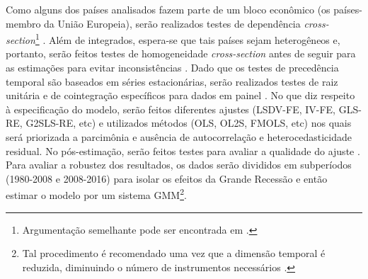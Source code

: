 Como alguns dos países analisados fazem parte de um bloco econômico (os países-membro da União Europeia), serão realizados testes de dependência \textit{cross-section}\footnote{Argumentação semelhante pode ser encontrada em \textcite{perez-montiel_autonomous_2020}.} \cites{breusch_lagrange_1980}{pesaran_bias-adjusted_2007}.
Além de integrados, espera-se que tais países sejam heterogêneos e, portanto, serão feitos testes de homogeneidade \textit{cross-section} antes de seguir para as estimações para evitar inconsistências \cites{pesaran_testing_2008}.
Dado que os testes de precedência temporal são baseados em séries estacionárias, serão realizados testes de raiz unitária e de cointegração específicos para dados em painel \cites{im_testing_2003}{pesaran_simple_2007}{canning_infrastructure_2008}. %
No que diz respeito à especificação do modelo, serão feitos diferentes ajustes (LSDV-FE, IV-FE, GLS-RE, G2SLS-RE, etc) e utilizados métodos (OLS, OL2S, FMOLS, etc) nos quais será priorizada a parcimônia e ausência de autocorrelação e heterocedasticidade residual. 
No pós-estimação, serão feitos testes para avaliar a qualidade do ajuste \cites{hausman_specification_1978}{maasoumi_testing_1988}.
Para avaliar a robustez dos resultados, os dados serão divididos em subperíodos (1980-2008 e 2008-2016) para isolar os efeitos da Grande Recessão e então estimar o modelo por um sistema GMM\footnote{ %
    Tal procedimento é recomendado uma vez que a dimensão temporal é reduzida, diminuindo o número de instrumentos necessários \cite{judson_estimating_1999}.
}. 



